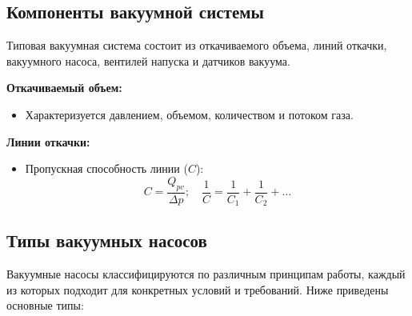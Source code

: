 \documentclass[12pt,oneside,a4paper]{article}
\begin{document}
\subsection{Компоненты вакуумной системы}
Типовая вакуумная система состоит из откачиваемого объема, линий откачки, вакуумного насоса, вентилей напуска и датчиков вакуума.

\textbf{Откачиваемый объем:}
\begin{itemize}
    \item Характеризуется давлением, объемом, количеством и потоком газа.
\end{itemize}

\textbf{Линии откачки:}
\begin{itemize}
    \item Пропускная способность линии (\( C \)):
    \begin{equation}
        C = \frac{Q_{pv}}{\Delta p}; \quad \frac{1}{C}=\frac{1}{C_1}+\frac{1}{C_2}+\ldots 
    \end{equation}
\end{itemize}

\subsection{Типы вакуумных насосов}

Вакуумные насосы классифицируются по различным принципам работы, каждый из которых подходит для конкретных условий и требований. Ниже приведены основные типы:
\end{document}
